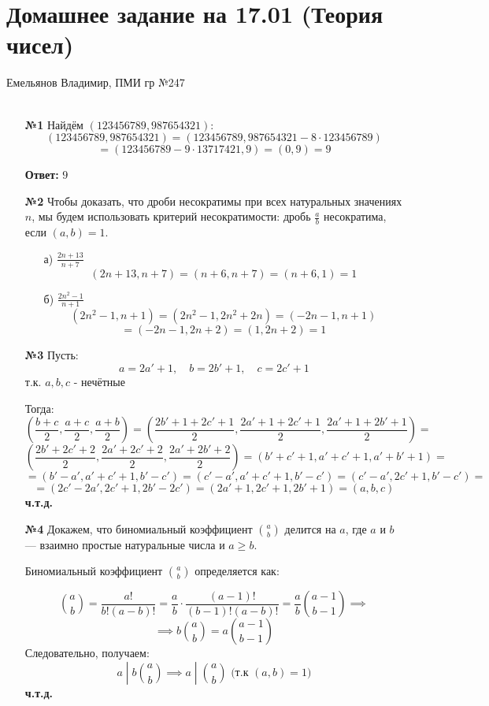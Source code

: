 \documentclass[a4paper]{article}
\renewcommand{\f}[2]{\frac{#1}{#2}}
\renewcommand{\geq}{\geqslant}
\begin{document}
\section*{Домашнее задание на 17.01 (Теория чисел)}
 {\large Емельянов Владимир, ПМИ гр №247}\\\\
\begin{enumerate}
    \item[\textbf{№1}]Найдём $(123456789, 987654321)$:
    $$(123456789, 987654321) = (123456789, 987654321-8\cdot 123456789)$$
    $$ = (123456789-9\cdot 13717421, 9) = (0, 9) = 9$$

    \textbf{Ответ: }$9$

    \item[\textbf{№2}]Чтобы доказать, что дроби несократимы при всех натуральных значениях $ n $, мы будем использовать критерий несократимости: дробь $\frac{a}{b}$ несократима, если $(a, b) = 1$.
    \begin{enumerate}
        \item[а)] $\f{2n+13}{n+7}$
        $$(2n+13, n+7) = (n+6, n+7) = (n+6, 1) = 1$$
        \item[б)]  $\f{2n^2-1}{n+1}$
        $$(2n^2-1, n+1) = (2n^2-1, 2n^2+2n) = (-2n-1, n+1)$$
        $$=(-2n-1, 2n+2) = (1, 2n+2) = 1$$
    \end{enumerate}

    \item[\textbf{№3}]Пусть: $$a = 2a'+1, \quad b=2b'+1, \quad c = 2c'+1$$
    т.к. $a, b, c$ - нечётные

    Тогда:
    $$(\f{b+c}{2}, \f{a+c}{2}, \f{a+b}{2})= (\f{2b'+1+2c'+1}{2}, \f{2a'+1+2c'+1}{2}, \f{2a'+1+2b'+1}{2}) = $$
    $$(\f{2b'+2c'+2}{2}, \f{2a'+2c'+2}{2}, \f{2a'+2b'+2}{2}) = (b'+c'+1, a'+c'+1, a'+b'+1)  = $$
    $$=(b'-a', a'+c'+1, b'-c')=(c'-a', a'+c'+1, b'-c') = (c'-a', 2c'+1, b'-c') = $$
    $$=(2c'-2a', 2c'+1, 2b'-2c') = (2a'+1, 2c'+1, 2b'+1) = (a, b, c)$$
    \textbf{ч.т.д.}

    \item[\textbf{№4}]Докажем, что биномиальный коэффициент $\binom{a}{b}$ делится на $a$, где $a$ и $b$ — взаимно простые натуральные числа и $a \geq b$.

    Биномиальный коэффициент $\binom{a}{b}$ определяется как:

    $$
    \binom{a}{b} = \frac{a!}{b!(a-b)!} = \f{a}{b}\cdot \frac{(a-1)!}{(b-1)!(a-b)!} = \f{a}{b} \binom{a-1}{b-1}\implies
    $$
    $$
    \implies b\binom{a}{b} = a\binom{a-1}{b-1} $$
    Следовательно, получаем:
    $$a\; |\;b\binom{a}{b} \implies a \;|\;\binom{a}{b}  \text{ (т.к $(a, b) = 1$)}
    $$
    \textbf{ч.т.д.}


\end{enumerate}
\end{document}
